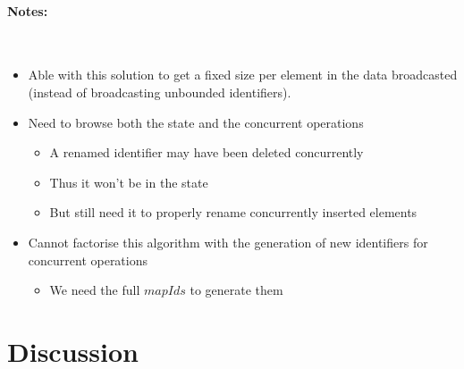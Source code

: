 \documentclass[a4paper]{article}
\begin{document}
\paragraph{Notes:}~\\

\begin{itemize}
  \item Able with this solution to get a fixed size per element in the data broadcasted
    (instead of broadcasting unbounded identifiers).
  \item Need to browse both the state and the concurrent operations
  \begin{itemize}
    \item A renamed identifier may have been deleted concurrently
    \item Thus it won't be in the state
    \item But still need it to properly rename concurrently inserted elements
  \end{itemize}
  \item Cannot factorise this algorithm with the generation of new identifiers
    for concurrent operations
  \begin{itemize}
    \item We need the full $mapIds$ to generate them
  \end{itemize}
\end{itemize}

\section{Discussion}
\end{document}
